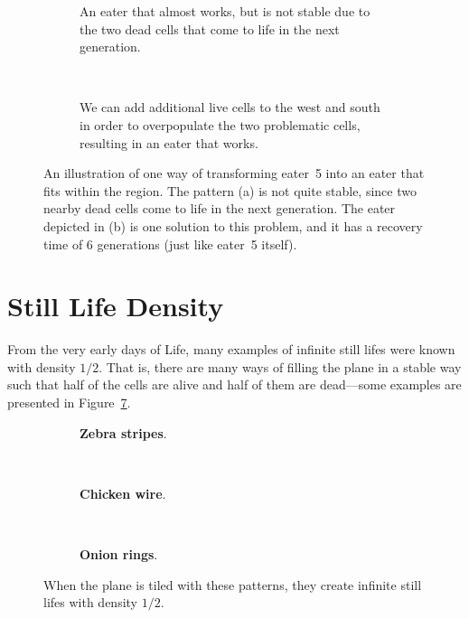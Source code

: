 \begin{figure}[!htb]
	\centering
	\begin{subfigure}{.4\textwidth}
		\centering
		\caption{An eater that almost works, but is not stable due to the two dead  cells that come to life in the next generation.}
		\label{fig:eater_constrained_eater_5_b}
	\end{subfigure} \quad \ %
	\begin{subfigure}{.54\textwidth}
		\centering
		\caption{We can add additional live cells to the west and south in order to overpopulate the two problematic cells, resulting in an eater that works.}
		\label{fig:eater_constrained_done}
	\end{subfigure}
	\caption{An illustration of one way of transforming eater~5 into an eater that fits within the  region. The pattern (a) is not quite stable, since two nearby dead cells come to life in the next generation. The eater depicted in (b) is one solution to this problem, and it has a recovery time of $6$ generations (just like eater~5 itself).}\label{fig:eater_constrained_eater_5_both_done}
\end{figure}


\section{Still Life Density}\label{sec:still_life_density}

From the very early days of Life, many examples of infinite still lifes were known with density $1/2$. That is, there are many ways of filling the plane in a stable way such that half of the cells are alive and half of them are dead---some examples are presented in Figure~\ref{fig:dense_still_lifes}.
\begin{figure}[!ht]
	\begin{subfigure}{.32\textwidth}
		\centering
		\caption{\textbf{Zebra stripes}.}
		\label{fig:zebra_stripes}
	\end{subfigure} \ \ %
	\begin{subfigure}{.32\textwidth}
		\centering
		\caption{\textbf{Chicken wire}.}
		\label{fig:chicken_wire}
	\end{subfigure} \ \ %
	\begin{subfigure}{.32\textwidth}
		\centering
		\caption{\textbf{Onion rings}.}
		\label{fig:onion_rings}
	\end{subfigure}
	\caption{When the plane is tiled with these patterns, they create infinite still lifes with density $1/2$.}\label{fig:dense_still_lifes}
\end{figure}

